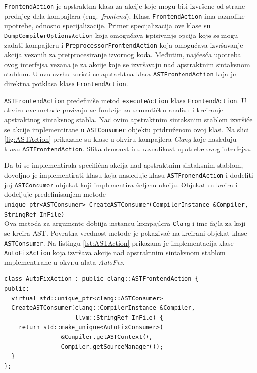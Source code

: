 \documentclass[12pt,oneside]{memoir}
\begin{document}
\texttt{FrontendAction} je apstraktna klasa za akcije koje mogu biti izvr\v{s}ene od strane prednjeg dela kompajlera (eng.~\textit{frontend}).
Klasa \texttt{FrontendAction} ima raznolike upotrebe, odnosno specijalizacije. Primer specijalizacija ove klase su \texttt{DumpCompiler\-OptionsAction}
koja omogu\'{c}ava ispisivanje opcija koje se mogu zadati kompajleru i \texttt{PreprocessorFrontendAction} koja omogu\'{c}ava izvr\v{s}avanje akcija vezanih za pretprocesiranje izvornog koda. Međutim, naj\v{c}es\'{c}a upotreba ovog interfejsa vezana je za akcije koje se izvr\v{s}avaju nad apstraktnim sintaksnom stablom. U ovu svrhu koristi se apstarktna klasa \texttt{ASTFrontendAction} koja je direktna potklasa klase \texttt{FrontendAction}. \par
\texttt{ASTFrontendAction} predefini\v{s}e metod \texttt{executeAction} klase \texttt{FrontendAction}. U okviru ove metode pozivaju se funkcije za semanti\v{c}ku analizu i kreiranje apstraktnog sintaksnog stabla. Nad ovim apstraktnim sintaksnim stablom izvr\v{s}i\'{c}e se akcije implementirane u \texttt{ASTConsumer} objektu pridru\v{z}enom ovoj klasi.
Na slici \ref{fig:ASTAction} prikazane su klase u okviru kompajlera \textit{Clang} koje nasleđuju klasu \texttt{ASTFrontendAction}. Slika demonstrira raznolikost upotrebe ovog interfejsa. \par
Da bi se implementirala specifi\v{c}na akcija nad apstraktnim sintaksnim stablom, dovoljno je implementirati klasu koja nasleđuje klasu \texttt{ASTFronendAction} i dodeliti joj \texttt{ASTConsumer} objekat koji implementira \v{z}eljenu akciju. Objekat se kreira i dodeljuje predefinisanjem metode \\ \texttt{unique\_ptr<ASTConsumer> CreateASTConsumer(CompilerInstance \&Compiler, StringRef InFile)} \\ 
Ova metoda za argumente dobiija instancu kompajlera \texttt{Clang} i ime fajla za koji se kreira AST. Povratna vrednost metode je pokaziva\v{c} na kreirani objekat klase \texttt{ASTConsumer}.
Na listingu \ref{lst:ASTAction} prikazana je implementacija klase \texttt{AutoFixAction} koja izvr\v{s}ava akcije nad apstraktnim sintaksnom stablom implementirane u okviru alata \textit{AutoFix}.

\begin{lstlisting}[style=customc,  caption={Implementacija klase AutoFixAction kori\v{s}\'{c}ene u okviru alata \textit{AutoFix}.}, label=lst:ASTAction]
class AutoFixAction : public clang::ASTFrontendAction {
public:
  virtual std::unique_ptr<clang::ASTConsumer>
  CreateASTConsumer(clang::CompilerInstance &Compiler, 
                    llvm::StringRef InFile) {
    return std::make_unique<AutoFixConsumer>(
                &Compiler.getASTContext(),
                Compiler.getSourceManager());
  }
};
\end{lstlisting}
\end{document}
